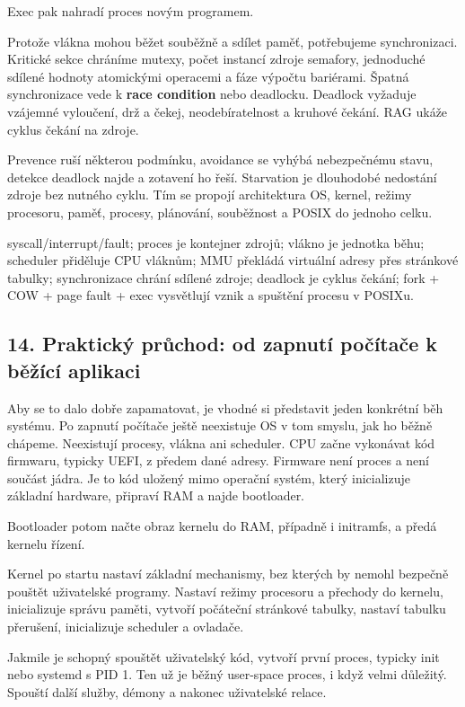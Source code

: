 \documentclass[11pt,a4paper]{article}
\begin{document}
Exec pak nahradí proces novým programem.

Protože vlákna mohou běžet souběžně a sdílet paměť, potřebujeme synchronizaci. Kritické sekce chráníme mutexy, počet instancí zdroje semafory, jednoduché sdílené hodnoty atomickými operacemi a fáze výpočtu bariérami. Špatná synchronizace vede k \textbf{race condition} nebo deadlocku. Deadlock vyžaduje vzájemné vyloučení, drž a čekej, neodebíratelnost a kruhové čekání. RAG ukáže cyklus čekání na zdroje.

Prevence ruší některou podmínku, avoidance se vyhýbá nebezpečnému stavu, detekce deadlock najde a zotavení ho řeší. Starvation je dlouhodobé nedostání zdroje bez nutného cyklu. Tím se propojí architektura OS, kernel, režimy procesoru, paměť, procesy, plánování, souběžnost a POSIX do jednoho celku.

syscall/interrupt/fault; proces je kontejner zdrojů; vlákno je jednotka běhu; scheduler přiděluje CPU vláknům; MMU překládá virtuální adresy přes stránkové tabulky; synchronizace chrání sdílené zdroje; deadlock je cyklus čekání; fork + COW + page fault + exec vysvětlují vznik a spuštění procesu v POSIXu.

\subsection*{14. Praktický průchod: od zapnutí počítače k běžící aplikaci}

Aby se to dalo dobře zapamatovat, je vhodné si představit jeden konkrétní běh systému. Po zapnutí počítače ještě neexistuje OS v tom smyslu, jak ho běžně chápeme. Neexistují procesy, vlákna ani scheduler. CPU začne vykonávat kód firmwaru, typicky UEFI, z předem dané adresy. Firmware není proces a není součást jádra. Je to kód uložený mimo operační systém, který inicializuje základní hardware, připraví RAM a najde bootloader.

Bootloader potom načte obraz kernelu do RAM, případně i initramfs, a předá kernelu řízení.

Kernel po startu nastaví základní mechanismy, bez kterých by nemohl bezpečně pouštět uživatelské programy. Nastaví režimy procesoru a přechody do kernelu, inicializuje správu paměti, vytvoří počáteční stránkové tabulky, nastaví tabulku přerušení, inicializuje scheduler a ovladače.

Jakmile je schopný spouštět uživatelský kód, vytvoří první proces, typicky init nebo systemd s PID 1. Ten už je běžný user-space proces, i když velmi důležitý. Spouští další služby, démony a nakonec uživatelské relace.
\end{document}
